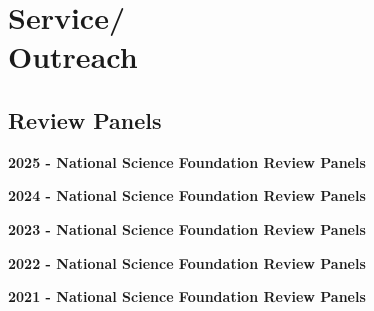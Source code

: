 \section{Service/\\Outreach}

\subsection{Review Panels}
\begin{cvlist}
\item \textbf{2025 - National Science Foundation Review Panels}
\item \textbf{2024 - National Science Foundation Review Panels}
\item \textbf{2023 - National Science Foundation Review Panels}
\item \textbf{2022 - National Science Foundation Review Panels}
\item \textbf{2021 - National Science Foundation Review Panels}

\end{cvlist}

\vspace{2em}
